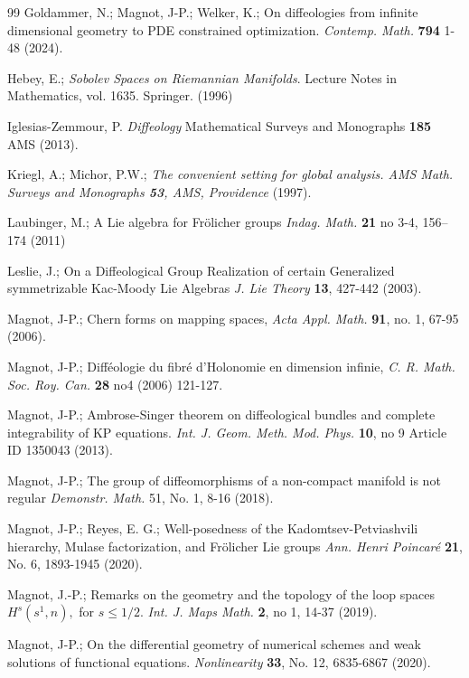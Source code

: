 \documentclass{amsart}
\newcounter{ex}
\newcounter{re}
\begin{document}
\begin{thebibliography}{99}
 Goldammer, N.; Magnot, J-P.; Welker, K.; On diffeologies from infinite dimensional geometry to PDE constrained optimization. \emph{Contemp. Math.} {\bf 794} 1-48 (2024). 
 
  Hebey, E.; \emph{Sobolev Spaces on Riemannian Manifolds}. Lecture Notes in Mathematics, vol. 1635. Springer. (1996)

 Iglesias-Zemmour, P.
\textit{Diffeology} 
Mathematical Surveys and Monographs \textbf{185} AMS  (2013).

 Kriegl, A.; Michor,  P.W.; 
\textit{The convenient setting for global analysis. 
AMS Math. Surveys and Monographs \textbf{53}, AMS, Providence } (1997).

 Laubinger, M.; A Lie algebra for Fr\"olicher groups \textit{Indag. Math.} \textbf{21} no 3-4, 156--174 (2011) 

 Leslie, J.; On a Diffeological Group Realization of certain Generalized symmetrizable Kac-Moody 
Lie Algebras \textit{J. Lie Theory} \textbf{13},
427-442 (2003).

 Magnot, J-P.; Chern forms on mapping spaces,
\textit{Acta Appl. Math.} \textbf{91}, no. 1, 67-95 (2006).

 Magnot, J-P.; Diff\'eologie du fibr\'e d'Holonomie en dimension infinie,
\textit{ C. R. Math. Soc. Roy. Can.} \textbf{28} no4 (2006)
121-127.

 Magnot, J-P.; Ambrose-Singer theorem on diffeological bundles and complete integrability
of KP equations. {\em Int. J. Geom. Meth. Mod. Phys.} {\bf 10}, no 9 Article ID
1350043 (2013).

 Magnot, J-P.; The group of diffeomorphisms of a non-compact manifold is not regular
\textit{Demonstr. Math.} 51, No. 1, 8-16 (2018).

 Magnot, J-P.; Reyes, E. G.; Well-posedness of the Kadomtsev-Petviashvili hierarchy, 
Mulase factorization, and Fr\"olicher Lie groups  \textit{Ann. Henri Poincar\'e}  {\bf 21}, No. 6, 1893-1945 (2020).

			{Magnot, J.-P.;}
			Remarks on the geometry and the topology of the loop spaces
			$H^{s}(s^1, n),$ for $s\leq 1/2$. \emph{Int. J. Maps Math.} {\bf 2}, no 1,  14-37 (2019).

Magnot, J-P.; 
On the differential geometry of numerical schemes and weak solutions of functional equations. 
\emph{Nonlinearity} {\bf 33}, No. 12, 6835-6867 (2020).


\end{thebibliography}
\end{document}
